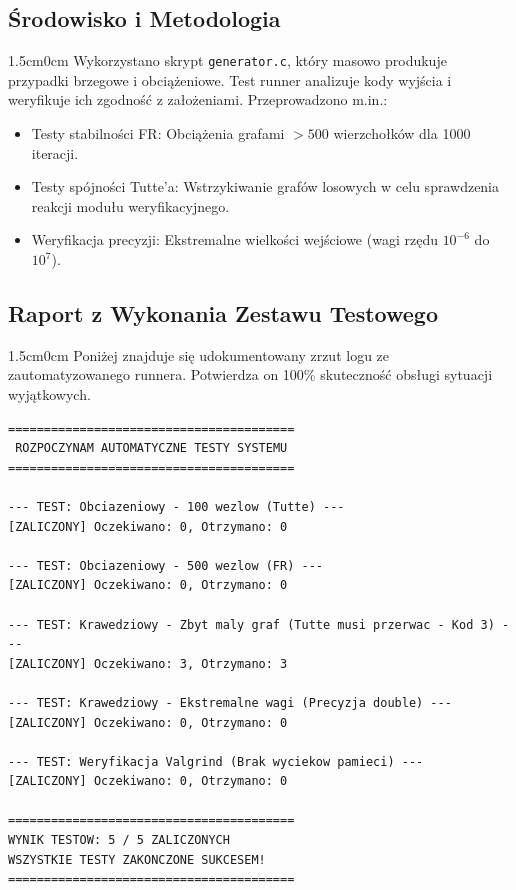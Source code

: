 \documentclass[12pt,a4paper]{article}
\begin{document}
\noindent
\begin{minipage}{\textwidth}
\subsection{Środowisko i Metodologia}
\begin{adjustwidth}{1.5cm}{0cm}
Wykorzystano skrypt \texttt{generator.c}, który masowo produkuje przypadki brzegowe i obciążeniowe. Test runner analizuje kody wyjścia i weryfikuje ich zgodność z założeniami. Przeprowadzono m.in.:
\begin{itemize}
    \item Testy stabilności FR: Obciążenia grafami $>500$ wierzchołków dla 1000 iteracji.
    \item Testy spójności Tutte'a: Wstrzykiwanie grafów losowych w celu sprawdzenia reakcji modułu weryfikacyjnego.
    \item Weryfikacja precyzji: Ekstremalne wielkości wejściowe (wagi rzędu $10^{-6}$ do $10^7$).
\end{itemize}
\end{adjustwidth}
\end{minipage}
\vspace{0.5cm}

\noindent
\begin{minipage}{\textwidth}
\subsection{Raport z Wykonania Zestawu Testowego}
\begin{adjustwidth}{1.5cm}{0cm}
Poniżej znajduje się udokumentowany zrzut logu ze zautomatyzowanego runnera. Potwierdza on 100\% skuteczność obsługi sytuacji wyjątkowych.

\begin{lstlisting}[style=terminal, caption={Log z konsoli z weryfikacji automatycznej}]
========================================
 ROZPOCZYNAM AUTOMATYCZNE TESTY SYSTEMU
========================================

--- TEST: Obciazeniowy - 100 wezlow (Tutte) ---
[ZALICZONY] Oczekiwano: 0, Otrzymano: 0

--- TEST: Obciazeniowy - 500 wezlow (FR) ---
[ZALICZONY] Oczekiwano: 0, Otrzymano: 0

--- TEST: Krawedziowy - Zbyt maly graf (Tutte musi przerwac - Kod 3) ---
[ZALICZONY] Oczekiwano: 3, Otrzymano: 3

--- TEST: Krawedziowy - Ekstremalne wagi (Precyzja double) ---
[ZALICZONY] Oczekiwano: 0, Otrzymano: 0

--- TEST: Weryfikacja Valgrind (Brak wyciekow pamieci) ---
[ZALICZONY] Oczekiwano: 0, Otrzymano: 0

========================================
WYNIK TESTOW: 5 / 5 ZALICZONYCH
WSZYSTKIE TESTY ZAKONCZONE SUKCESEM!
========================================
\end{lstlisting}
\end{adjustwidth}
\end{minipage}
\vspace{0.5cm}
\end{document}
